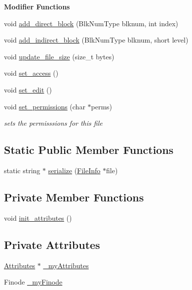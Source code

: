\begin{Indent}\textbf{ Modifier Functions}\par
\begin{DoxyCompactItemize}
\item 
void \mbox{\hyperlink{class_file_info_a1537d2ac2b5c170d144911c8337c81bc}{add\+\_\+direct\+\_\+block}} (Blk\+Num\+Type blknum, int index)
\item 
void \mbox{\hyperlink{class_file_info_a074956f43b5a6900205a541dbeaeb8c5}{add\+\_\+indirect\+\_\+block}} (Blk\+Num\+Type blknum, short level)
\item 
void \mbox{\hyperlink{class_file_info_a3c548a8dfcb6530bfef7551ac24ca473}{update\+\_\+file\+\_\+size}} (size\+\_\+t bytes)
\item 
void \mbox{\hyperlink{class_file_info_aacaeadeeb41726f8cbea0b7cb1ff6a22}{set\+\_\+access}} ()
\item 
void \mbox{\hyperlink{class_file_info_a05eb10c6804660ecd47e556c27ecd019}{set\+\_\+edit}} ()
\item 
void \mbox{\hyperlink{class_file_info_a377208012195dba0b24723837f6db39f}{set\+\_\+permissions}} (char $\ast$perms)
\begin{DoxyCompactList}\small\item\em sets the permisssions for this file \end{DoxyCompactList}\end{DoxyCompactItemize}
\end{Indent}
\subsection*{Static Public Member Functions}
\begin{DoxyCompactItemize}
\item 
static string $\ast$ \mbox{\hyperlink{class_file_info_a64fc62c3e376dfd61088932d8b793589}{serialize}} (\mbox{\hyperlink{class_file_info}{File\+Info}} $\ast$file)
\end{DoxyCompactItemize}
\subsection*{Private Member Functions}
\begin{DoxyCompactItemize}
\item 
void \mbox{\hyperlink{class_file_info_abad45da4fbc2f1da564a23a2c3e6caff}{init\+\_\+attributes}} ()
\end{DoxyCompactItemize}
\subsection*{Private Attributes}
\begin{DoxyCompactItemize}
\item 
\mbox{\hyperlink{class_attributes}{Attributes}} $\ast$ \mbox{\hyperlink{class_file_info_ad074cd1ea6b131fe01d7bd18a9da7230}{\+\_\+my\+Attributes}}
\item 
Finode \mbox{\hyperlink{class_file_info_aa9f9a75407d29778170a902e070d47ad}{\+\_\+my\+Finode}}
\end{DoxyCompactItemize}
